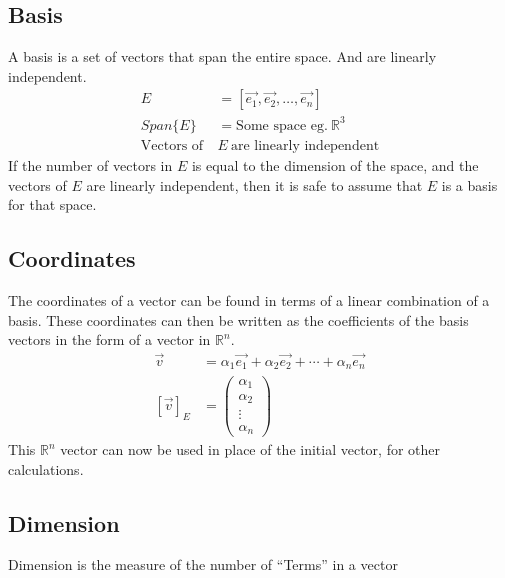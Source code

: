 \documentclass[12pt]{article}
\begin{document}
\subsection{Basis}\label{b:b}
A basis is a set of vectors that span the entire space. And are linearly independent.
\begin{align}
  E &= \left[ \vec{e_1}, \vec{e_2}, \ldots, \vec{e_n} \right]\\
  Span\{E\} &= \text{Some space eg.}\ \mathbb{R}^3\\
  \text{Vectors of}\ &E\ \text{are linearly independent}
\end{align}
If the number of vectors in $E$ is equal to the dimension of the space, and the vectors of $E$ are linearly independent, then it is safe to assume that $E$ is a basis for that space.
\subsection{Coordinates}\label{b:c}
The coordinates of a vector can be found in terms of a linear combination of a basis. These coordinates can then be written as the coefficients of the basis vectors in the form of a vector in $\mathbb{R}^n$.
\begin{align}
  \vec{v} &= \alpha_1\vec{e_1} + \alpha_2\vec{e_2} + \cdots + \alpha_n\vec{e_n}\\
  {\left[\vec{v}\right]}_E &= \left(\begin{array}{c}
    \alpha_1 \\ \alpha_2 \\ \vdots \\ \alpha_n
  \end{array}\right)
\end{align}
This $\mathbb{R}^n$ vector can now be used in place of the initial vector, for other calculations.
\subsection{Dimension}\label{b:d}
Dimension is the measure of the number of ``Terms'' in a vector
\end{document}
